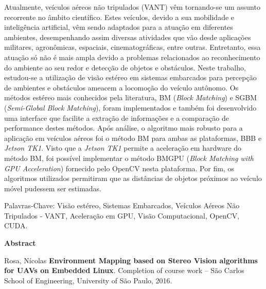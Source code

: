 Atualmente, veículos aéreos não tripulados (VANT) vêm tornando-se um assunto recorrente no âmbito científico. Estes veículos, devido a sua mobilidade e inteligência artificial, vêm sendo adaptados para a atuação em diferentes ambientes, desempenhando assim diversas atividades que vão desde aplicações militares, agronômicas, espaciais, cinematográficas, entre outras. Entretanto, essa atuação só não é mais ampla devido a problemas relacionados ao reconhecimento do ambiente ao seu redor e detecção de objetos e obstáculos. Neste trabalho, estudou-se a utilização de visão estéreo em sistemas embarcados para percepção de ambientes e obstáculos ameacem a locomoção do veículo autônomo. Os métodos estéreo mais conhecidos pela literatura, BM (\textit{Block Matching}) e SGBM (\textit{Semi-Global Block Matching}), foram implementados e também foi desenvolvido uma interface que facilite a extração de informações e a comparação de performance destes métodos. Após análise, o algoritmo mais robusto para a aplicação em veículos aéreos foi o método BM para ambas as plataformas, BBB e \textit{Jetson TK1}. Visto que a \textit{Jetson TK1} permite a aceleração em hardware do método BM, foi possível implementar o método BMGPU (\textit{Block Matching with GPU Acceleration}) fornecido pelo OpenCV nesta plataforma. Por fim, os algoritmos utilizados permitiram que as distâncias de objetos próximos ao veículo móvel pudessem ser estimadas.

\vspace{0.05\textheight}

Palavras-Chave: Visão estéreo, Sistemas Embarcados, Veículos Aéreos Não Tripulados - VANT, Aceleração em GPU, Visão Computacional, OpenCV, CUDA.


\cleardoublepage


\vspace{0.11\textheight} 

\begin{center}
\textbf{\Huge{Abstract}}
\end{center}

\vspace{0.05\textheight}

Rosa, Nícolas \textbf{Environment Mapping based on Stereo Vision algorithms for UAVs on Embedded Linux}. Completion of course work -- São Carlos School of Engineering, University of São Paulo, 2016.

